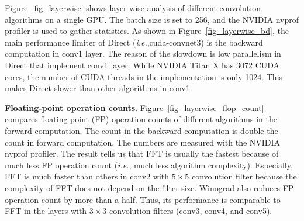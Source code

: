 Figure~\ref{fig_layerwise} shows layer-wise analysis of different convolution algorithms on a single GPU. The batch size is set to 256, and the NVIDIA nvprof profiler is used to gather statistics. As shown in Figure~\ref{fig_layerwise_bd}, the main performance limiter of \textsf{Direct} (\textit{i.e.},cuda-convnet3) is the backward computation in \textsf{conv1} layer. The reason of the slowdown is low parallelism in \textsf{Direct} that implement \textsf{conv1} layer. While NVIDIA Titan X has 3072 CUDA cores, the number of CUDA threads in the implementation is only 1024. This makes \textsf{Direct} slower than other algorithms in \textsf{conv1}. 


{\bf Floating-point operation counts}. Figure~\ref{fig_layerwise_flop_count} compares floating-point (FP) operation counts of different algorithms in the forward computation. The count in the backward computation is double the count in forward computation.  The numbers are measured with the NVIDIA nvprof profiler. The result tells us that \textsf{FFT} is usually the fastest because of much less FP operation count (\textit{i.e.}, much less algorithm complexity). Especially, \textsf{FFT} is much faster than others in \textsf{conv2} with $5 \times 5$ convolution filter because the complexity of \textsf{FFT} does not depend on the filter size. \textsf{Winograd} also reduces FP operation count by more than a half. Thus, its performance is comparable to \textsf{FFT} in the layers with $3 \times 3$ convolution filters (\textsf{conv3}, \textsf{conv4}, and \textsf{conv5}).


